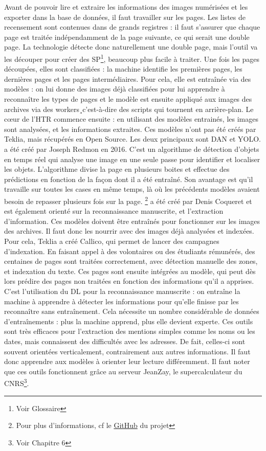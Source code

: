 Avant de pouvoir lire et extraire les informations des images numérisées et les exporter dans la base de données, il faut travailler sur les pages. Les listes de recensement sont contenues dans de grands registres : il faut s’assurer que chaque page est traitée indépendamment de la page suivante, ce qui serait une double page. La technologie détecte donc naturellement une double page, mais l’outil va les découper pour créer des \gls{SP}\footnote{Voir Glossaire}, beaucoup plus facile à traiter. 
Une fois les pages découpées, elles sont classifiées : la machine identifie les premières pages, les dernières pages et les pages intermédiaires. Pour cela, elle est entraînée via des modèles : on lui donne des images déjà classifiées pour lui apprendre à reconnaître les types de pages et le modèle est ensuite appliqué aux images des archives via des workers¸c’est-à-dire des scripts qui tournent en arrière-plan. 
Le cœur de l'\gls{HTR} commence ensuite : en utilisant des modèles entrainés, les images sont analysées, et les informations extraites. Ces modèles n’ont pas été créés par Teklia, mais récupérés en Open Source. Les deux principaux sont \gls{DAN} et \gls{YOLO}. \YOLO{} a été créé par Joseph Redmon en 2016.  C’est un algorithme de détection d'objets en temps réel qui analyse une image en une seule passe pour identifier et localiser les objets. L’algorithme divise la page en plusieurs boites et effectue des prédictions en fonction de la façon dont il a été entraîné. Son avantage est qu’il travaille sur toutes les cases en même temps, là où les précédents modèles avaient besoin de repasser plusieurs fois sur la page. \DAN{}\footnote{Pour plus d'informations, cf le \href{https://github.com/FactoDeepLearning/DAN}{GitHub} du projet} a été créé par Denis Coqueret et est également orienté sur la reconnaissance manuscrite, et l’extraction d’information. 
Ces modèles doivent être entraînés pour fonctionner sur les images des archives. Il faut donc les nourrir avec des images déjà analysées et indexées. Pour cela, Teklia a créé Callico, qui permet de lancer des campagnes d’indexation. En faisant appel à des volontaires ou des étudiants rémunérés, des centaines de pages sont traitées correctement, avec détection manuelle des zones, et indexation du texte. Ces pages sont ensuite intégrées au modèle, qui peut dès lors prédire des pages non traitées en fonction des informations qu’il a apprises. C’est l’utilisation du \gls{DL} pour la reconnaissance manuscrite : on entraîne la machine à apprendre à détecter les informations pour qu'elle finisse par les reconnaître sans entraînement. Cela nécessite un nombre considérable de données d’entraînements : plus la machine apprend, plus elle devient experte. Ces outils sont très efficaces pour l'extraction des mentions simples comme les noms ou les dates, mais connaissent des difficultés avec les adresses. De fait, celles-ci sont souvent orientées verticalement, contrairement aux autres informations. Il faut donc apprendre aux modèles à orienter leur lecture différemment. 
Il faut noter que ces outils fonctionnent grâce au serveur JeanZay, le supercalculateur du CNRS\footnote{Voir Chapitre 6}.

